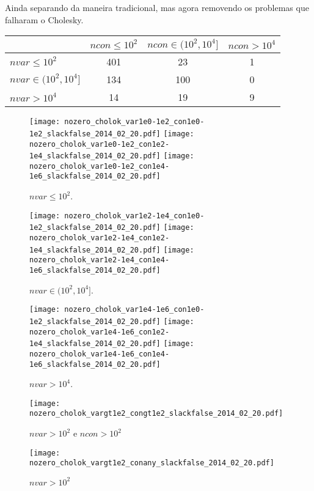\documentclass{article}
\begin{document}
Ainda separando da maneira tradicional, mas agora removendo os problemas que
falharam o Cholesky.
\begin{center}
\begin{tabular}{|l|c|c|c|} \hline
& $ncon \leq 10^2$ & $ncon \in (10^2,10^4]$ & $ncon > 10^4$ \\ \hline
$nvar \leq 10^2$       & 401 &  23 &  1 \\ \hline
$nvar \in (10^2,10^4]$ & 134 & 100 &  0 \\ \hline
$nvar > 10^4$          &  14 &  19 &  9 \\ \hline
\end{tabular}
\end{center}

\begin{figure}[H]
\centering
\texttt{[image: nozero\_cholok\_var1e0-1e2\_con1e0-1e2\_slackfalse\_2014\_02\_20.pdf]}
\texttt{[image: nozero\_cholok\_var1e0-1e2\_con1e2-1e4\_slackfalse\_2014\_02\_20.pdf]}
\texttt{[image: nozero\_cholok\_var1e0-1e2\_con1e4-1e6\_slackfalse\_2014\_02\_20.pdf]}
\caption{ $nvar \leq 10^2$. }
\label{fig:nvar_small}
\end{figure}
\begin{figure}[H]
\centering
\texttt{[image: nozero\_cholok\_var1e2-1e4\_con1e0-1e2\_slackfalse\_2014\_02\_20.pdf]}
\texttt{[image: nozero\_cholok\_var1e2-1e4\_con1e2-1e4\_slackfalse\_2014\_02\_20.pdf]}
\texttt{[image: nozero\_cholok\_var1e2-1e4\_con1e4-1e6\_slackfalse\_2014\_02\_20.pdf]}
\caption{ $nvar \in (10^2,10^4]$. }
\label{fig:nvar_medium}
\end{figure}
\begin{figure}[H]
\centering
\texttt{[image: nozero\_cholok\_var1e4-1e6\_con1e0-1e2\_slackfalse\_2014\_02\_20.pdf]}
\texttt{[image: nozero\_cholok\_var1e4-1e6\_con1e2-1e4\_slackfalse\_2014\_02\_20.pdf]}
\texttt{[image: nozero\_cholok\_var1e4-1e6\_con1e4-1e6\_slackfalse\_2014\_02\_20.pdf]}
\caption{ $nvar > 10^4$. }
\label{fig:nvar_big}
\end{figure}

\begin{figure}[H]
\centering
\texttt{[image: nozero\_cholok\_vargt1e2\_congt1e2\_slackfalse\_2014\_02\_20.pdf]}
\caption{ $nvar > 10^2$ e $ncon > 10^2$ }
\label{fig:both_medium_and_big}
\end{figure}

\begin{figure}[H]
\centering
\texttt{[image: nozero\_cholok\_vargt1e2\_conany\_slackfalse\_2014\_02\_20.pdf]}
\caption{ $nvar > 10^2$ }
\label{fig:nvar_medium_and_big}
\end{figure}
\end{document}
